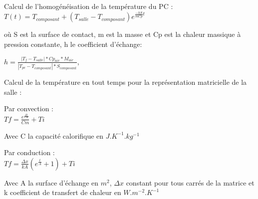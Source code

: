 \documentclass{article}
\begin{document}
\begin{flushleft}
\begin{Large}
Calcul de l'homogénéisation de la température du PC :
$T(t) = T_{composant} + (T_{salle} - T_{composant})e^{\frac{-hS}{mCp}t}$
\\
\par\leavevmode\par
o\`u S est la surface de contact, m est la masse et Cp est la chaleur massique \`a pression constante, h le coefficient d'\'echange:
\\
\par\leavevmode\par
$h =  \frac{|T_{f} - T_{salle}|  * Cp_{air} * M_{air}}{|T_{pc}-T_{composant}|*S_{composant}} $,

\par\leavevmode\par
\par\leavevmode\par
Calcul de la température en tout temps pour la représentation matricielle de la salle :
\par\leavevmode\par
Par convection :
\\

$Tf = \frac{e^{\frac{\Delta t}{Cm}}}{Cm}+Ti$

Avec C la capacit\'e calorifique en $J.K^{-1}.kg^{-1}$
\par\leavevmode\par
Par conduction :
\\
$Tf = \frac{\Delta x}{kA}(e^{\frac{t}{A}}+1)+Ti$

Avec A la surface d'échange en $m^{2}$, $\Delta x$ constant pour tous carr\'es de la matrice et k coefficient de transfert de chaleur en $W.m^{-2}.K^{-1}$












\end{Large}
\end{flushleft}
\end{document}
